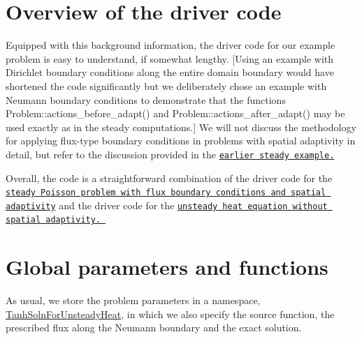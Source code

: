 


 

\hypertarget{index_overview}{}\section{Overview of the driver code}\label{index_overview}
Equipped with this background information, the driver code for our example problem is easy to understand, if somewhat lengthy. \mbox{[}Using an example with Dirichlet boundary conditions along the entire domain boundary would have shortened the code significantly but we deliberately chose an example with Neumann boundary conditions to demonstrate that the functions {\ttfamily Problem\+::actions\+\_\+before\+\_\+adapt()} and {\ttfamily Problem\+::actions\+\_\+after\+\_\+adapt()} may be used exactly as in the steady computations.\mbox{]} We will not discuss the methodology for applying flux-\/type boundary conditions in problems with spatial adaptivity in detail, but refer to the discussion provided in the \href{../../../poisson/two_d_poisson_flux_bc_adapt/html/index.html}{\tt earlier steady example.}

Overall, the code is a straightforward combination of the driver code for the \href{../../../poisson/two_d_poisson_flux_bc_adapt/html/index.html}{\tt steady Poisson problem with flux boundary conditions and spatial adaptivity} and the driver code for the \href{../../two_d_unsteady_heat/html/index.html}{\tt unsteady heat equation without spatial adaptivity. }



 

\hypertarget{index_namespace}{}\section{Global parameters and functions}\label{index_namespace}
As usual, we store the problem parameters in a namespace, {\ttfamily \hyperlink{namespaceTanhSolnForUnsteadyHeat}{Tanh\+Soln\+For\+Unsteady\+Heat}}, in which we also specify the source function, the prescribed flux along the Neumann boundary and the exact solution.



 

